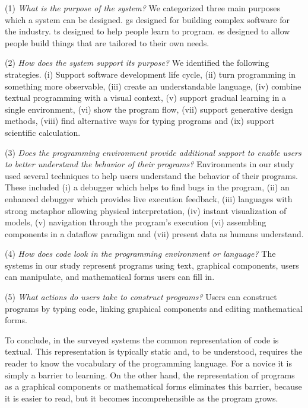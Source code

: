 (1) \textit{What is the purpose of the system?} We categorized three main purposes which a system can be designed. \ac{gs} designed for building complex software for the industry. \ac{ts} designed to help people learn to program. \ac{es} designed to allow people build things that are tailored to their own needs.

(2) \textit{How does the system support its purpose?} We identified the following strategies. (i) Support software development life cycle, (ii) turn programming in something more observable, (iii) create an understandable language, (iv) combine textual programming with a visual context, (v) support gradual learning in a single environment, (vi) show the program flow, (vii) support generative design methods, (viii) find alternative ways for typing programs and (ix) support scientific calculation.

(3) \textit{Does the programming environment provide additional support to enable users to better understand the behavior of their programs?} Environments in our study used several techniques to help users understand the behavior of their programs. These included (i) a debugger which helps to find bugs in the program, (ii) an enhanced debugger which provides live execution feedback, (iii) languages with strong metaphor allowing physical interpretation, (iv) instant visualization of models, (v) navigation through the program's execution (vi) assembling components in a dataflow paradigm and (vii) present data as humans understand.

(4) \textit{How does code look in the programming environment or language?} The systems in our study represent programs using text, graphical components, users can manipulate, and mathematical forms users can fill in.

(5) \textit{What actions do users take to construct programs?} Users can construct programs by typing code, linking graphical components and editing mathematical forms.

To conclude, in the surveyed systems the common representation of code is textual. This representation is typically static and, to be understood, requires the reader to know the vocabulary of the programming language. For a novice it is simply a barrier to learning. On the other hand, the representation of programs as a graphical components or mathematical forms eliminates this barrier, because it is easier to read, but it becomes incomprehensible as the program grows.